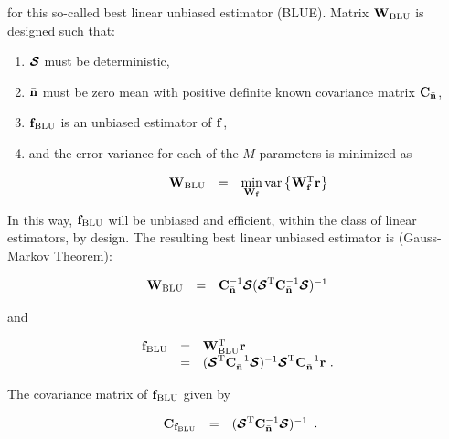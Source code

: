 \documentclass[a4paper,11pt,fleqn]{article}
\newcommand{\br}{{\mathbf r}}
\newcommand{\bC}{{\bf C}}
\newcommand{\bn}{{\bf n}}
\newcommand{\bbf}{{\bf f}}
\newcommand{\bW}{{\bf W}}
\newcommand{\bcS}{{\mbox {\boldmath ${\cal S}$}}}
\begin{document}
\noindent for this so-called best linear unbiased estimator
(BLUE). Matrix $\bW_{\rm BLU}$ is designed such that:

\begin{enumerate}

\item $\bcS$ must be deterministic,

\item $\bar{\bn}$ must be zero mean with positive definite known
covariance matrix $\bC_{\bar{\bn}}$,

\item ${\bbf}_{\rm BLU}$ is an unbiased estimator of $\bbf$,

\item and the error variance for each of the $M$ parameters is
minimized as

\begin{equation}
\begin{array}{rcl}
\bW_{\rm BLU}&=&\min\limits_{\bW_{\bbf}}
\mbox{var}\left\{\bW_{\bbf}^{\rm T}\br\right\}
\end{array}
\end{equation}


\end{enumerate}

In this way, ${\bbf}_{\rm BLU}$ will be unbiased and efficient,
within the class of linear estimators, by design. The resulting
best linear unbiased estimator is (Gauss-Markov Theorem):

\begin{equation}
\begin{array}{rcl}
{\bW}_{\rm BLU}&=&\bC_{\bar{\bn}}^{-1}\bcS(\bcS^{\rm
T}\bC_{\bar{\bn}}^{-1}\bcS)^{-1}
\end{array}
\end{equation}

\noindent and

\begin{equation}
\begin{array}{rcl}
{\bbf}_{\rm BLU}&=&\bW_{\rm BLU}^{\rm T}\br\\
 &=&(\bcS^{\rm
T}\bC_{\bar{\bn}}^{-1}\bcS)^{-1}\bcS^{\rm
T}\bC_{\bar{\bn}}^{-1}\br\ .
\end{array} \label{BLUE}
\end{equation}

\noindent The covariance matrix of ${\bbf}_{\rm BLU}$ given by

\begin{equation}
\begin{array}{rcl}
{\bC}_{\bbf_{\rm BLU}}&=&(\bcS^{\rm
T}\bC_{\bar{\bn}}^{-1}\bcS)^{-1}
\end{array}.
\end{equation}
\end{document}
